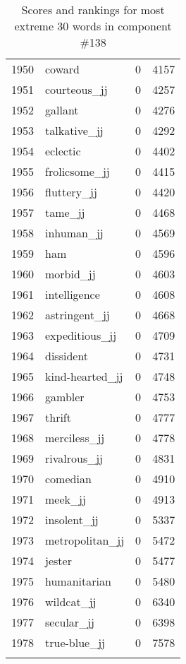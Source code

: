 \begin{longtable}[!htbp]{| rlr@{.}l |}
    1950 & coward & 0 & 4157 \\
    1951 & courteous\_jj & 0 & 4257 \\
    1952 & gallant & 0 & 4276 \\
    1953 & talkative\_jj & 0 & 4292 \\
    1954 & eclectic & 0 & 4402 \\
    1955 & frolicsome\_jj & 0 & 4415 \\
    1956 & fluttery\_jj & 0 & 4420 \\
    1957 & tame\_jj & 0 & 4468 \\
    1958 & inhuman\_jj & 0 & 4569 \\
    1959 & ham & 0 & 4596 \\
    1960 & morbid\_jj & 0 & 4603 \\
    1961 & intelligence & 0 & 4608 \\
    1962 & astringent\_jj & 0 & 4668 \\
    1963 & expeditious\_jj & 0 & 4709 \\
    1964 & dissident & 0 & 4731 \\
    1965 & kind-hearted\_jj & 0 & 4748 \\
    1966 & gambler & 0 & 4753 \\
    1967 & thrift & 0 & 4777 \\
    1968 & merciless\_jj & 0 & 4778 \\
    1969 & rivalrous\_jj & 0 & 4831 \\
    1970 & comedian & 0 & 4910 \\
    1971 & meek\_jj & 0 & 4913 \\
    1972 & insolent\_jj & 0 & 5337 \\
    1973 & metropolitan\_jj & 0 & 5472 \\
    1974 & jester & 0 & 5477 \\
    1975 & humanitarian & 0 & 5480 \\
    1976 & wildcat\_jj & 0 & 6340 \\
    1977 & secular\_jj & 0 & 6398 \\
    1978 & true-blue\_jj & 0 & 7578 \\
    \hline
    \caption{Scores and rankings for most extreme 30 words in component \#138} \\
\end{longtable}
